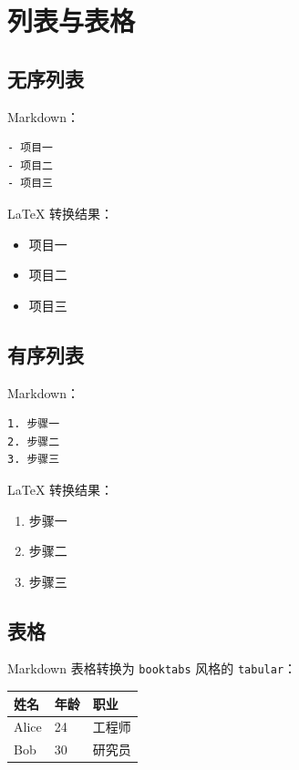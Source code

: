 \documentclass[fontset=fandol,11pt,a4paper]{ctexart}
\begin{document}
\section{列表与表格}
\label{sec:list-table}

\subsection{无序列表}
\label{subsec:ul}

Markdown：
\begin{codebox}[Markdown]
\begin{lstlisting}
- 项目一
- 项目二
- 项目三
\end{lstlisting}
\end{codebox}

LaTeX 转换结果：
\begin{itemize}
  \item 项目一
  \item 项目二
  \item 项目三
\end{itemize}

\subsection{有序列表}
\label{subsec:ol}

Markdown：
\begin{codebox}[Markdown]
\begin{lstlisting}
1. 步骤一
2. 步骤二
3. 步骤三
\end{lstlisting}
\end{codebox}

LaTeX 转换结果：
\begin{enumerate}
  \item 步骤一
  \item 步骤二
  \item 步骤三
\end{enumerate}

\subsection{表格}
\label{subsec:table}

Markdown 表格转换为 \verb|booktabs| 风格的 \verb|tabular|：

\begin{center}
\begin{tabular}{lll}
\toprule
\textbf{姓名} & \textbf{年龄} & \textbf{职业} \\
\midrule
Alice & 24 & 工程师 \\
Bob & 30 & 研究员 \\
\bottomrule
\end{tabular}
\end{center}
\end{document}
